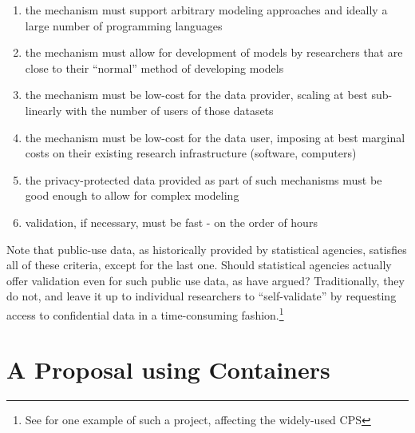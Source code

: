\documentclass[12pt]{article}
\begin{document}
\begin{enumerate}
    \item the mechanism must support arbitrary modeling approaches and ideally a large number of programming languages
    \item the mechanism must allow for development of models by researchers that are close to their ``normal'' method of developing models
    \item the mechanism must be low-cost for the data provider, scaling at best sub-linearly with the number of users of those datasets
    \item the mechanism must be low-cost for the data user, imposing at best marginal costs on their existing research infrastructure (software, computers)
    \item the privacy-protected data provided as part of such mechanisms must be good enough to allow for complex modeling
    \item validation, if necessary, must be fast - on the order of hours
\end{enumerate}

Note that public-use data, as historically provided by statistical agencies, satisfies all of these criteria, except for the last one. Should statistical agencies actually offer validation even for such public use data, as \citet{reiter_verification_2009} have argued? Traditionally, they do not, and leave it up to individual researchers to ``self-validate'' by requesting access to confidential data in a time-consuming fashion.\footnote{See \cite{armour_using_2016} for one example of such a project, affecting the widely-used \ac{CPS}}

\section{A Proposal using Containers}
\label{sec:proposal}
\end{document}
